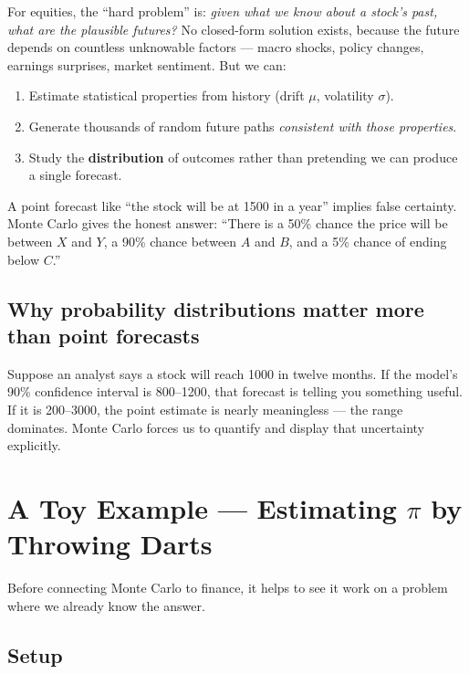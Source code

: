 \documentclass[11pt, a4paper]{article}
\begin{document}
For equities, the ``hard problem'' is: \emph{given what we know about a stock's past, what are the plausible futures?} No closed-form solution exists, because the future depends on countless unknowable factors — macro shocks, policy changes, earnings surprises, market sentiment. But we can:

\begin{enumerate}[leftmargin=2em]
  \item Estimate statistical properties from history (drift $\mu$, volatility $\sigma$).
  \item Generate thousands of random future paths \emph{consistent with those properties}.
  \item Study the \textbf{distribution} of outcomes rather than pretending we can produce a single forecast.
\end{enumerate}

A point forecast like ``the stock will be at \rupee{}1500 in a year'' implies false certainty. Monte Carlo gives the honest answer: ``There is a 50\% chance the price will be between $X$ and $Y$, a 90\% chance between $A$ and $B$, and a 5\% chance of ending below $C$.''

\subsection*{Why probability distributions matter more than point forecasts}

Suppose an analyst says a stock will reach \rupee{}1000 in twelve months. If the model's 90\% confidence interval is \rupee{}800–1200, that forecast is telling you something useful. If it is \rupee{}200–3000, the point estimate is nearly meaningless — the range dominates. Monte Carlo forces us to quantify and display that uncertainty explicitly.

\section{A Toy Example — Estimating $\pi$ by Throwing Darts}
\label{sec:pi}

Before connecting Monte Carlo to finance, it helps to see it work on a problem where we already know the answer.

\subsection*{Setup}
\end{document}
